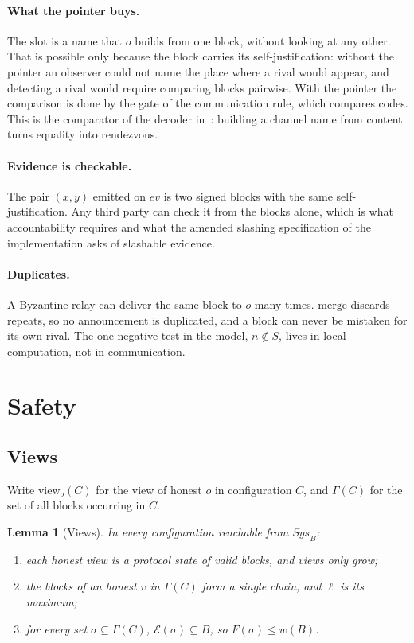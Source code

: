 \documentclass[11pt]{article}
\newtheorem{lemma}[theorem]{Lemma}
\theoremstyle{definition}
\theoremstyle{remark}
\newcommand{\Eq}{\mathcal{E}}
\newcommand{\view}{\mathrm{view}}
\newcommand{\merge}{\mathrm{merge}}
\newcommand{\Gam}{\Gamma}
\begin{document}
\paragraph{What the pointer buys.}
The slot is a name that $o$ builds from one block, without looking at any
other. That is possible only because the block carries its self-justification:
without the pointer an observer could not name the place where a rival would
appear, and detecting a rival would require comparing blocks pairwise. With the
pointer the comparison is done by the gate of the communication rule, which
compares codes. This is the comparator of the decoder in~\cite[\S7]{oriented}:
building a channel name from content turns equality into rendezvous.

\paragraph{Evidence is checkable.}
The pair $(x,y)$ emitted on $\mathit{ev}$ is two signed blocks with the same
self-justification. Any third party can check it from the blocks alone, which
is what accountability requires and what the amended slashing specification of
the implementation asks of slashable evidence.

\paragraph{Duplicates.}
A Byzantine relay can deliver the same block to $o$ many times. $\merge$
discards repeats, so no announcement is duplicated, and a block can never be
mistaken for its own rival. The one negative test in the model, $n\notin S$,
lives in local computation, not in communication.

\section{Safety}\label{sec:safety}

\subsection{Views}

Write $\view_o(C)$ for the view of honest $o$ in configuration $C$, and
$\Gam(C)$ for the set of all blocks occurring in $C$.

\begin{lemma}[Views]\label{lem:views}
In every configuration reachable from $\mathit{Sys}_B$:
\begin{enumerate}[label=(\roman*)]
\item each honest view is a protocol state of valid blocks, and views only
  grow;
\item the blocks of an honest $v$ in $\Gam(C)$ form a single chain, and
  $\ell$ is its maximum;
\item for every set $\sigma\subseteq\Gam(C)$, $\Eq(\sigma)\subseteq B$, so
  $F(\sigma)\le w(B)$.
\end{enumerate}
\end{lemma}
\end{document}
